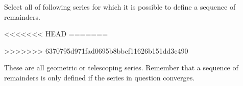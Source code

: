 \documentclass{ximera}
\author{Jim Talamo}
\begin{document}
\begin{exercise}

Select all of following series for which it is possible to define a sequence of remainders.

<<<<<<< HEAD
=======
\begin{selectAll}
\end{selectAll}
>>>>>>> 6370795d971fad0695b8bbcf11626b151dd3c490

\begin{hint}
These are all geometric or telescoping series.  Remember that a sequence of remainders is only defined if the series in question converges.
\end{hint}
\end{exercise}
\end{document}
